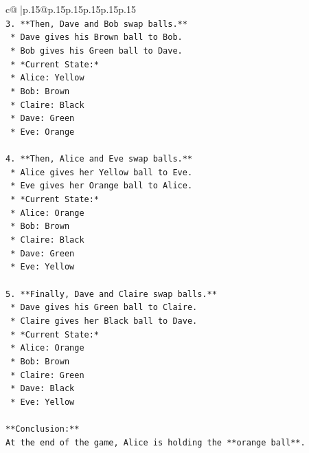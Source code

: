 \documentclass{article}
\begin{document}
{\begin{supertabular}{c@{$\;$}|p{.15\linewidth}@{}p{.15\linewidth}p{.15\linewidth}p{.15\linewidth}p{.15\linewidth}p{.15\linewidth}}
{{{\\ 
\texttt{3.  **Then, Dave and Bob swap balls.**} \\
\texttt{    *   Dave gives his Brown ball to Bob.} \\
\texttt{    *   Bob gives his Green ball to Dave.} \\
\texttt{    *   *Current State:*} \\
\texttt{        *   Alice: Yellow} \\
\texttt{        *   Bob: Brown} \\
\texttt{        *   Claire: Black} \\
\texttt{        *   Dave: Green} \\
\texttt{        *   Eve: Orange} \\
\\ 
\texttt{4.  **Then, Alice and Eve swap balls.**} \\
\texttt{    *   Alice gives her Yellow ball to Eve.} \\
\texttt{    *   Eve gives her Orange ball to Alice.} \\
\texttt{    *   *Current State:*} \\
\texttt{        *   Alice: Orange} \\
\texttt{        *   Bob: Brown} \\
\texttt{        *   Claire: Black} \\
\texttt{        *   Dave: Green} \\
\texttt{        *   Eve: Yellow} \\
\\ 
\texttt{5.  **Finally, Dave and Claire swap balls.**} \\
\texttt{    *   Dave gives his Green ball to Claire.} \\
\texttt{    *   Claire gives her Black ball to Dave.} \\
\texttt{    *   *Current State:*} \\
\texttt{        *   Alice: Orange} \\
\texttt{        *   Bob: Brown} \\
\texttt{        *   Claire: Green} \\
\texttt{        *   Dave: Black} \\
\texttt{        *   Eve: Yellow} \\
\\ 
\texttt{**Conclusion:**} \\
\texttt{At the end of the game, Alice is holding the **orange ball**.} \\
\\ 
}}}
\end{supertabular}}
\end{document}
